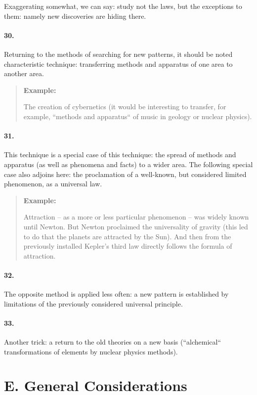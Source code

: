 \documentclass[11pt,a4paper]{article}
\newenvironment{example}{\begin{quote} \textbf{Example:}\par }{\end{quote}}
\begin{document}
Exaggerating somewhat, we can say: study not the laws, but the exceptions to
them: namely new discoveries are hiding there.

\paragraph{30.}
Returning to the methods of searching for new patterns, it should be noted
characteristic technique: transferring methods and apparatus of one area to
another area.

\begin{example}
  The creation of cybernetics (it would be interesting to transfer, for example,
  “methods and apparatus“ of music in geology or nuclear physics).
\end{example}
\paragraph{31.}
This technique is a special case of this technique: the spread of methods and
apparatus (as well as phenomena and facts) to a wider area.  The following
special case also adjoins here: the proclamation of a well-known, but
considered limited phenomenon, as a universal law.

\begin{example}
  Attraction -- as a more or less particular phenomenon -- was widely known
  until Newton. But Newton proclaimed the universality of gravity (this led to
  do that the planets are attracted by the Sun). And then from the previously
  installed Kepler’s third law directly follows the formula of attraction.
\end{example}

\paragraph{32.}
The opposite method is applied less often: a new pattern is established by
limitations of the previously considered universal principle.

\paragraph{33.}
Another trick: a return to the old theories on a new basis (“alchemical“
transformations of elements by nuclear physics methods).

\section*{E. General Considerations}
\end{document}
